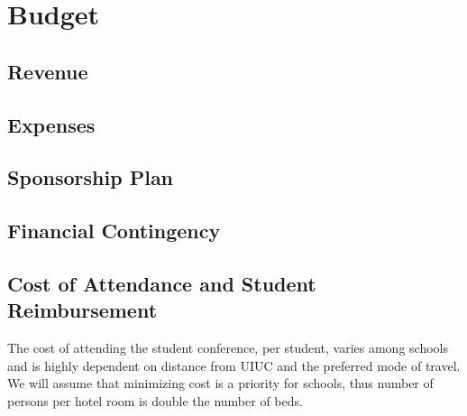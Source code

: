 \section{Budget}


\subsection{Revenue}

\subsection{Expenses}

\subsection{Sponsorship Plan}



\subsection{Financial Contingency}

\subsection{Cost of Attendance and Student Reimbursement}
The cost of attending the student conference, per student, varies among schools and is highly dependent on distance from UIUC and the preferred mode of travel. We will assume that minimizing cost is a priority for schools, thus number of persons per hotel room is double the number of beds. 

